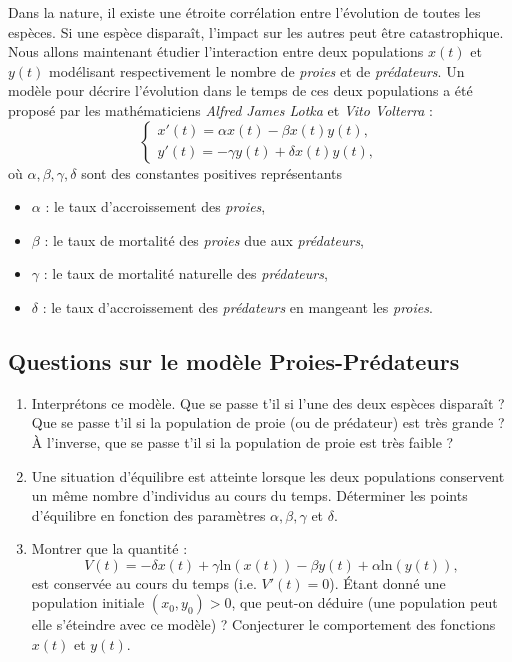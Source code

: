 \documentclass{../ficheTDTP}
\begin{document}
	Dans la nature, il existe une étroite corrélation entre l'évolution de toutes les espèces. Si une espèce disparaît, l'impact sur les autres peut être catastrophique. Nous allons maintenant étudier l'interaction entre deux populations $x(t)$ et $y(t)$ modélisant respectivement le nombre de \textit{proies} et de \textit{prédateurs}. Un modèle pour décrire l'évolution dans le temps de ces deux populations a été proposé par les mathématiciens \textit{Alfred James Lotka} et \textit{Vito Volterra} :
\begin{equation}\label{eq:mod-Lotka-Volterra}
	\begin{cases}
		x'(t) = \alpha x(t) - \beta x(t) y(t),\\
		y'(t) = -\gamma y(t) + \delta x(t) y(t),
	\end{cases}
\end{equation}	
où $\alpha, \beta, \gamma, \delta$ sont des constantes positives représentants \begin{itemize}
\item $\alpha$ : le taux d'accroissement des \textit{proies},
\item $\beta$ : le taux de mortalité des \textit{proies} due aux \textit{prédateurs},
\item $\gamma$ : le taux de mortalité naturelle des \textit{prédateurs},
\item $\delta$ : le taux d'accroissement des \textit{prédateurs} en mangeant les \textit{proies}.\\
\end{itemize}


\subsection{Questions sur le modèle Proies-Prédateurs}
\begin{enumerate}
	\item Interprétons ce modèle. Que se passe t'il si l'une des deux espèces disparaît ? Que se passe t'il si la population de proie (ou de prédateur) est très grande ? À l'inverse, que se passe t'il si la population de proie est très faible ?	
	\item Une situation d'équilibre est atteinte lorsque les deux populations conservent un même nombre d'individus au cours du temps. Déterminer les points d'équilibre en fonction des paramètres $\alpha, \beta, \gamma$ et $\delta$.
	\item Montrer que la quantité :
\[
	V(t) = -\delta x(t) + \gamma \text{ln}\left( x(t) \right) - \beta y(t) + \alpha \text{ln} \left( y(t) \right),
\]
est conservée au cours du temps (i.e. $V'(t) = 0$). Étant donné une population initiale $(x_0,y_0)>0$, que peut-on déduire (une population peut elle s'éteindre avec ce modèle) ? Conjecturer le comportement des fonctions $x(t)$ et $y(t)$.
\end{enumerate}
\end{document}
